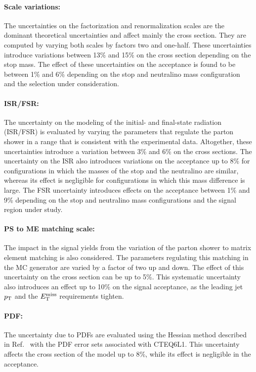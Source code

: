 \paragraph{Scale variations:} The uncertainties on the factorization and renormalization scales are the dominant theoretical uncertainties and affect mainly the cross section.
They are computed by varying both scales by factors two and one-half.
These uncertainties introduce variations between 13\% and 15\% on the cross section depending on the stop mass.
The effect of these uncertainties on the acceptance is found to be between 1\% and 6\% depending on the stop and neutralino mass configuration and the selection under consideration.

\paragraph{ISR/FSR:} The uncertainty on the modeling of the initial- and final-state radiation (ISR/FSR) is evaluated by varying the parameters that regulate the parton shower in a range that is consistent with the experimental data.
Altogether, these uncertainties introduce a variation between 3\% and 6\% on the cross sections.
The uncertainty on the ISR also introduces variations on the acceptance up to 8\% for configurations in which the masses of the stop and the neutralino are similar, whereas its effect is negligible for configurations in which this mass difference is large.
The FSR uncertainty introduces effects on the acceptance between 1\% and 9\% depending on the stop and neutralino mass configurations and the signal region under study.

\paragraph{PS to ME matching scale:}The impact in the signal yields from the variation of the parton shower to matrix element matching is also considered.
The parameters regulating this matching in the MC generator are varied by a factor of two up and down. 
The effect of this uncertainty on the cross section can be up to 5\%.
This systematic uncertainty also introduces an effect up to 10\% on the signal acceptance, as the leading jet $p_{\mathrm{T}}$ and the $E_{\mathrm{T}}^{\mathrm{miss}}$ requirements tighten.

\paragraph{PDF:} The uncertainty due to PDFs are evaluated using the Hessian method described in Ref.~\cite{Pumplin:2001ct} with the PDF error sets associated with CTEQ6L1.
This uncertainty affects the cross section of the model up to 8\%, while its effect is negligible in the acceptance.

